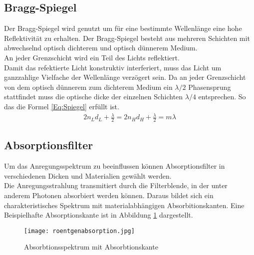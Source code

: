 \subsection{Bragg-Spiegel}
Der Bragg-Spiegel wird genutzt um für eine bestimmte Wellenlänge eine hohe Reflektivität zu erhalten.
Der Bragg-Spiegel besteht aus mehreren Schichten mit abwechselnd optisch dichterem und optisch dünnerem Medium.\\
An jeder Grenzschicht wird ein Teil des Lichts reflektiert.\\
Damit das refektierte Licht konstruktiv interferiert, muss das Licht um ganzzahlige Vielfache der Wellenlänge verzögert sein. Da an jeder Grenzschicht von dem optisch dünnerem zum dichterem Medium ein $\lambda/2$ Phasensprung stattfindet muss die optische dicke der einzelnen Schichten $\lambda/4$ entsprechen. So das die Formel \ref{Eq:Spiegel} erfüllt ist.\\
\begin{align}
    2n_{L}d_{L}+\frac {\lambda }{2}=2n_{H}d_{H}+\frac{\lambda }{2}=m \lambda 
    \label{Eq:Spiegel}
\end{align}


\subsection{Absorptionsfilter}
Um das Anregungsspektrum zu beeinflussen können Absorptionsfilter in verschiedenen Dicken und Materialien gewählt werden.\\
Die Anregungsstrahlung transmitiert durch die Filterblende, in der unter anderem Photonen absorbiert werden können. Daraus bildet sich ein charakteristisches Spektrum mit materialabhängigen Absorbitionskanten. Eine Beispielhafte Absorptionskante ist in Abbildung \ref{fig:Kante} dargestellt.\\
\begin{figure}[h]
 \centering
 \texttt{[image: roentgenabsorption.jpg]}
 \caption[Absortionskante]{Absorbtionsspektrum mit Absorbtionskante \cite{bib:Kante} }
 \label{fig:Kante}
\end{figure}
